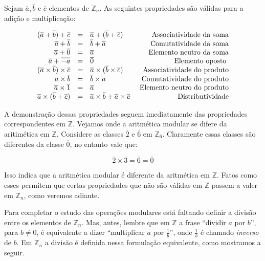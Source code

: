 Sejam $\overline{a}, \overline{b}$ e $\overline{c}$ elementos de $\mathbb{Z}_{n}$. 
As seguintes propriedades s\~{a}o v\'{a}lidas para a adi\c{c}\~{a}o e multiplica\c{c}\~{a}o:

\[
\begin{array}{rclr}
(\overline{a}+\overline{b})+\overline{c} &=& \overline{a}+(\overline{b}+\overline{c}) & \hfill\textrm{ Associatividade da soma}\\
\overline{a}+\overline{b}									 &=& \overline{b}+\overline{a} 								& \hfill\textrm{ Comutatividade da soma}\\
\overline{a}+\overline{0} 							 &=& \overline{a} 														& \hfill\textrm{ Elemento neutro da soma}\\
\overline{a}+\overline{-a}							 &=& \overline{0} 														& \hfill\textrm{ Elemento oposto }\\
(\overline{a}\times\overline{b})\times\overline{c} &=& \overline{a}\times(\overline{b}\times\overline{c}) & \hfill\textrm{ Associatividade do produto}\\
\overline{a}\times\overline{b}								 &=& \overline{b}\times\overline{a} 								& \hfill\textrm{ Comutatividade do produto}\\
\overline{a}\times\overline{1} 							 &=& \overline{a} 														& \hfill\textrm{ Elemento neutro do produto}\\
\overline{a}\times(\overline{b}+\overline{c})&=& \overline{a}\times\overline{b}+\overline{a}\times\overline{c} 														& \hfill\textrm{ Distributividade}\\
\end{array}
\]

A demonstra\c{c}\~{a}o dessas propriedades seguem imediatamente das propriedades correspondentes em $\mathbb{Z}$.
Vejamos onde a aritm\'{e}tica modular se difere da aritim\'{e}tica em $\mathbb{Z}$. Considere as classes 
$\overline{2}$ e $\overline{6}$ em $\mathbb{Z}_{6}$. Claramente essas classes s\~{a}o diferentes
da classe $\overline{0}$, no entanto vale que:

$$\overline{2}\times\overline{3}=\overline{6}=\overline{0}$$
 
Isso indica que a aritm\'{e}tica modular \'{e} diferente da aritm\'{e}tica em $\mathbb{Z}$. Fatos como esses 
permitem que certas propriedades que n\~{a}o s\~{a}o v\'{a}lidas em $\mathbb{Z}$ passem a valer em $\mathbb{Z}_{n}$, como veremos 
adiante. 

Para completar o estudo das opera\c{c}\~{o}es modulares est\'{a} faltando definir a divis\~{a}o entre os elementos de $\mathbb{Z}_{n}$.
Mas, antes, lembre que em $\mathbb{Z}$ a frase ``dividir $a$ por $b$'', para $b\neq 0$, \'{e} equivalente a dizer
``multiplicar $a$ por $\frac{1}{b}$'', onde $\frac{1}{b}$ \'{e} chamado \textit{inverso} de $b$. 
Em $\mathbb{Z}_{n}$ a divis\~{a}o \'{e} definida nessa formula\c{c}\~{a}o equivalente, como mostramos a seguir. 

